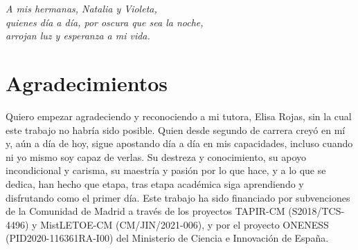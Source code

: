 

\cleardoublepage %
\chapter*{}
\setlength{\leftmargin}{0.5\textwidth}
\setlength{\parsep}{0cm}
\addtolength{\topsep}{0.5cm}
\begin{flushright}
	\small\em{
		A mis hermanas, Natalia y Violeta,\\
		quienes día a día, por oscura que sea la noche,\\
		arrojan luz y esperanza a mi vida.
	}
\end{flushright}




\chapter*{Agradecimientos}

\thispagestyle{empty}
\vspace{1cm}

Quiero empezar agradeciendo y reconociendo a mi tutora, Elisa Rojas, sin la cual este trabajo no habría sido posible. Quien desde segundo de carrera creyó en mí y, aún a día de hoy, sigue apostando día a día en mis capacidades, incluso cuando ni yo mismo soy capaz de verlas. Su destreza y conocimiento, su apoyo incondicional y carisma, su maestría y pasión por lo que hace, y a lo que se dedica, han hecho que etapa, tras etapa académica siga aprendiendo y disfrutando como el primer día. Este trabajo ha sido financiado por subvenciones de la Comunidad de Madrid a través de los proyectos TAPIR-CM (S2018/TCS-4496) y MistLETOE-CM (CM/JIN/2021-006), y por el proyecto ONENESS (PID2020-116361RA-I00) del Ministerio de Ciencia e Innovación de España.\newline

